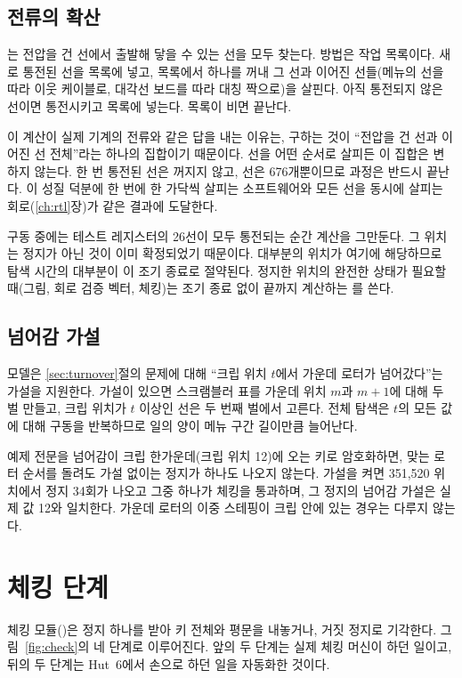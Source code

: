 \subsection{전류의 확산}

는 전압을 건 선에서 출발해 닿을 수 있는 선을 모두 찾는다. 방법은 작업 목록이다.
새로 통전된 선을 목록에 넣고, 목록에서 하나를 꺼내 그 선과 이어진 선들(메뉴의 선을 따라 이웃 케이블로,
대각선 보드를 따라 대칭 짝으로)을 살핀다. 아직 통전되지 않은 선이면 통전시키고 목록에 넣는다. 목록이
비면 끝난다.

이 계산이 실제 기계의 전류와 같은 답을 내는 이유는, 구하는 것이 ``전압을 건 선과 이어진 선 전체''라는
하나의 집합이기 때문이다. 선을 어떤 순서로 살피든 이 집합은 변하지 않는다. 한 번 통전된 선은 꺼지지
않고, 선은 676개뿐이므로 과정은 반드시 끝난다. 이 성질 덕분에 한 번에 한 가닥씩 살피는 소프트웨어와
모든 선을 동시에 살피는 회로(\ref{ch:rtl}장)가 같은 결과에 도달한다.

구동 중에는 테스트 레지스터의 26선이 모두 통전되는 순간 계산을 그만둔다. 그 위치는 정지가 아닌 것이
이미 확정되었기 때문이다. 대부분의 위치가 여기에 해당하므로 탐색 시간의 대부분이 이 조기 종료로 절약된다.
정지한 위치의 완전한 상태가 필요할 때(그림, 회로 검증 벡터, 체킹)는 조기 종료 없이 끝까지 계산하는
를 쓴다.

\subsection{넘어감 가설}\label{sec:sw-turnover}

모델은 \ref{sec:turnover}절의 문제에 대해 ``크립 위치 $t$에서 가운데 로터가 넘어갔다''는 가설을
지원한다. 가설이 있으면 스크램블러 표를 가운데 위치 $m$과 $m+1$에 대해 두 벌 만들고, 크립 위치가 $t$
이상인 선은 두 번째 벌에서 고른다. 전체 탐색은 $t$의 모든 값에 대해 구동을 반복하므로 일의 양이 메뉴
구간 길이만큼 늘어난다.

예제 전문을 넘어감이 크립 한가운데(크립 위치 12)에 오는 키로 암호화하면, 맞는 로터 순서를 돌려도 가설
없이는 정지가 하나도 나오지 않는다. 가설을 켜면 351,520 위치에서 정지 34회가 나오고 그중 하나가
체킹을 통과하며, 그 정지의 넘어감 가설은 실제 값 12와 일치한다. 가운데 로터의 이중 스테핑이 크립 안에
있는 경우는 다루지 않는다.

\section{체킹 단계}\label{sec:sw-check}

체킹 모듈()은 정지 하나를 받아 키 전체와 평문을 내놓거나, 거짓 정지로 기각한다.
그림~\ref{fig:check}의 네 단계로 이루어진다. 앞의 두 단계는 실제 체킹 머신이 하던 일이고, 뒤의 두 단계는
Hut~6에서 손으로 하던 일을 자동화한 것이다.

